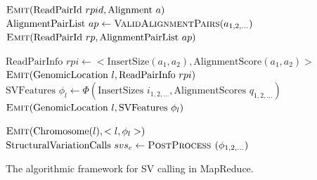 \documentclass[11pt]{article}
\begin{document}
\begin{algorithm}
\algrenewcommand{}
  \begin{algorithmic}[1]
    \State $\textsc{Emit}(\textrm{ReadPairId }rpid, \textrm{Alignment }a)$
    \EndFor
    \EndFunction
    \State $\textrm{AlignmentPairList }ap \gets \textsc{ValidAlignmentPairs}(a_{1,2,\ldots})$
    \State $\textsc{Emit}(\textrm{ReadPairId }rp, \textrm{AlignmentPairList } ap)$
    \EndFunction
    \EndProcedure

    \State $ \textrm{ReadPairInfo }rpi \gets <\textrm{InsertSize}(a_1,a_2), \textrm{AlignmentScore}(a_1,a_2)>$
    \State $\textsc{Emit}(\textrm{GenomicLocation }l, \textrm{ReadPairInfo }rpi)$
    \EndFor
    \EndFor
    \EndFunction
    \State $\textrm{SVFeatures } \phi_l \gets \Phi(\textrm{InsertSizes }i_{1,2,\ldots}, \textrm{AlignmentScores }q_{1,2,\ldots})$
    \State $\textsc{Emit}(\textrm{GenomicLocation }l, \textrm{SVFeatures } \phi_l)$
    \EndFunction
    \EndProcedure

    \State $\textsc{Emit}(\textrm{Chromosome}(l), <l,\phi_l>)$
    \EndFunction
    \State $\textrm{StructuralVariationCalls } svs_c \gets \textsc{PostProcess }(\phi_{1,2,\ldots})$
    \EndFunction
    \EndProcedure
  \end{algorithmic}
\label{cloudbreakAlgorithm}
\caption{The algorithmic framework for SV calling in MapReduce.}
\end{algorithm}
\end{document}
